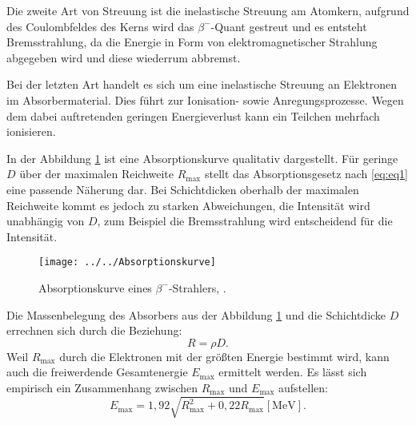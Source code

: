 Die zweite Art von Streuung ist die inelastische Streuung am Atomkern, aufgrund des Coulombfeldes des Kerns wird das $\beta^{-}$-Quant gestreut und es entsteht Bremsstrahlung, da die Energie in Form von elektromagnetischer Strahlung abgegeben wird und diese wiederrum abbremst.

Bei der letzten Art handelt es sich um eine inelastische Streuung an Elektronen im Absorbermaterial. Dies führt zur Ionisation- sowie Anregungsprozesse. Wegen dem dabei auftretenden geringen Energieverlust kann ein Teilchen mehrfach ionisieren.

In der Abbildung \ref{fig:absorptionskurve} ist eine Absorptionskurve qualitativ dargestellt. Für geringe $D$ über der maximalen Reichweite $R_\text{max}$ stellt das Absorptionsgesetz nach \ref{eq:eq1} eine passende Näherung dar. Bei Schichtdicken oberhalb der maximalen Reichweite kommt es jedoch zu starken Abweichungen, die Intensität wird unabhängig von $D$, zum Beispiel die Bremsstrahlung wird entscheidend für die Intensität.
\begin{figure}[h!]
	\centering
	\texttt{[image: ../../Absorptionskurve]}
	\caption{Absorptionskurve eines $\beta^{-}$-Strahlers, \cite[12]{anleitung704}.}
	\label{fig:absorptionskurve}
\end{figure}
Die Massenbelegung des Absorbers aus der Abbildung \ref{fig:absorptionskurve} und die Schichtdicke $D$ errechnen sich durch die Beziehung:
\begin{equation*}
R = \rho D.
\end{equation*}
Weil $R_\text{max}$ durch die Elektronen mit der größten Energie bestimmt wird, kann auch die freiwerdende Gesamtenergie $E_\text{max}$ ermittelt werden. Es lässt sich empirisch ein Zusammenhang zwischen $R_\text{max}$ und $E_\text{max}$ aufstellen:
\begin{equation*}
E_\text{max} = 1,92\sqrt{R_\text{max}^{2}+0,22R_\text{max}}\left[\si{\mega\electronvolt}\right].
\end{equation*}
